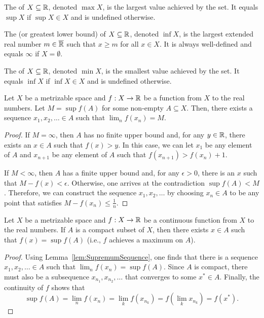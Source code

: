\begin{definition}
The  of $X\subseteq \mathbb{R}$, denoted $\max X$, is the largest value achieved by the set.
It equals $\sup X$ if $\sup X \in X$ and is undefined otherwise.
\end{definition}

\begin{definition}
The  (or greatest lower bound) of $X\subseteq \mathbb{R}$, denoted $\inf X$, is the largest extended real number $m \in \overline{\mathbb{R}}$ such that $x\geq m$ for all $x\in X$.
It is always well-defined and equals $\infty$ if $X=\emptyset$.
\end{definition}

\begin{definition}
The  of $X\subseteq \mathbb{R}$, denoted $\min X$, is the smallest value achieved by the set.
It equals $\inf X$ if $\inf X \in X$ and is undefined otherwise.
\end{definition}

\begin{lemma}
\label{lem:SupremumSequence}
Let $X$ be a metrizable space and $f: X\rightarrow \mathbb{R}$ be a function from $X$ to the real numbers.
Let $M = \sup f(A)$ for some non-empty $A \subseteq X$.
Then, there exists a sequence $x_1,x_2,\ldots \in A$ such that $\lim_n f(x_n) = M$.
\end{lemma}
\begin{proof}
If $M=\infty$, then $A$ has no finite upper bound and, for any $y\in \mathbb{R}$, there exists an $x\in A$ such that $f(x)>y$.
In this case, we can let $x_1$ be any element of $A$ and $x_{n+1}$ be any element of $A$ such that $f(x_{n+1}) > f(x_n) + 1$.

If $M<\infty$, then $A$ has a finite upper bound and, for any $\epsilon >0$, there is an $x$ such that $M-f(x)<\epsilon$.
Otherwise, one arrives at the contradiction $\sup f(A) < M$.
Therefore, we can construct the sequence $x_1,x_2,\ldots$ by choosing $x_n\in A$ to be any point that satisfies $M-f(x_n)\leq \frac{1}{n}$.
\end{proof}

\begin{theorem}
Let $X$ be a metrizable space and $f: X\rightarrow \mathbb{R}$ be a continuous function from $X$ to the real numbers.
If $A$ is a compact subset of $X$, then there exists $x\in A$ such that $f(x)=\sup f(A)$ (i.e., $f$ achieves a maximum on $A$).
\end{theorem}
\begin{proof}
Using Lemma~\ref{lem:SupremumSequence}, one finds that there is a sequence $x_1,x_2,\ldots \in A$ such that $\lim_n f(x_n) = \sup f(A)$.
Since $A$ is compact, there must also be a subsequence $x_{n_1},x_{n_2},\ldots$ that converges to some $x^* \in A$.
Finally, the continuity of $f$ shows that
\[\sup f(A) = \lim_n f(x_n) = \lim_k f(x_{n_k}) = f(\lim_k x_{n_k}) = f(x^*).\]
\end{proof}

